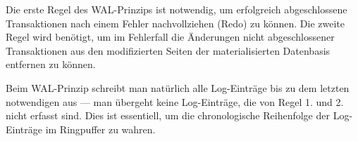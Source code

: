 \documentclass{bschlangaul-theorie}
\begin{document}
Die erste Regel des WAL-Prinzips ist notwendig, um erfolgreich
abgeschlossene Transaktionen nach einem Fehler nachvollziehen (Redo) zu
können. Die zweite Regel wird benötigt, um im Fehlerfall die Änderungen
nicht abgeschlossener Transaktionen aus den modifizierten Seiten der
materialisierten Datenbasis entfernen zu können.

Beim WAL-Prinzip schreibt man natürlich alle Log-Einträge bis zu dem
letzten notwendigen aus — \dh man übergeht keine Log-Einträge, die von
Regel 1. und 2. nicht erfasst sind. Dies ist essentiell, um die
chronologische Reihenfolge der Log-Einträge im Ringpuffer zu wahren.

\literatur
\end{document}
